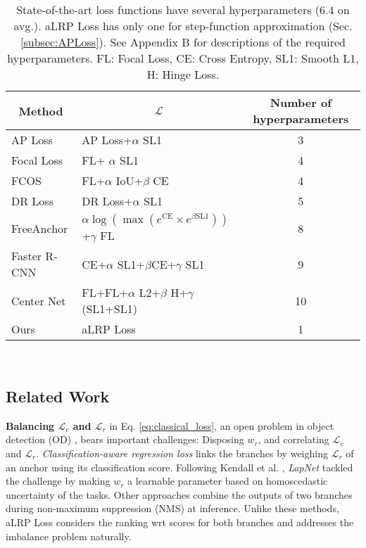 \documentclass{article}
\newcommand{\cellcenter}[1]{\multicolumn{1}{|c|}{#1}}
\begin{document}
\begin{table}[t]
\centering
    \caption{State-of-the-art loss functions have several hyperparameters ($6.4$ on avg.). aLRP Loss has only one for step-function approximation (Sec. \ref{subsec:APLoss}). See Appendix B for descriptions of the required hyperparameters. FL: Focal Loss, CE: Cross Entropy, SL1: Smooth L1, H: Hinge Loss. }
    \label{tab:Hyperparameters}
    \begin{tabular}{|l|l|c|}\hline
         \cellcenter{Method}& \cellcenter{$\mathcal{L}$} & Number of hyperparameters \\ \hline \hline
        AP Loss \cite{APLoss}&AP Loss+$\alpha$ SL1&3 \\ \hline
        Focal Loss \cite{FocalLoss}&FL+ $\alpha$ SL1&4\\ \hline
        FCOS \cite{FCOS}&FL+$\alpha$ IoU+$\beta$ CE&4\\  \hline
        DR Loss \cite{DRLoss}&DR Loss+$\alpha$ SL1&5\\ \hline
        FreeAnchor \cite{FreeAnchor}& $\alpha \log(\max( e^\text{CE} \times e^{\beta \text{SL1}}))$+$\gamma$ FL&8\\\hline
        Faster R-CNN \cite{FasterRCNN}&CE+$\alpha$ SL1+$\beta$CE+$\gamma$ SL1&9\\ \hline
        Center Net \cite{CenterNet}&FL+FL+$\alpha$ L2+$\beta$ H+$\gamma$ (SL1+SL1)&10\\ \hline \hline
        Ours&aLRP Loss&1 \\ \hline
    \end{tabular}\\
\end{table}



%
 \subsection{Related Work}
\label{sec:RelatedWork}
\textbf{Balancing $\mathcal{L}_c$ and $\mathcal{L}_r$} in Eq. \eqref{eq:classical_loss}, an open problem in object detection (OD) \cite{Review}, bears important challenges: Disposing $w_r$, and correlating $\mathcal{L}_c$ and $\mathcal{L}_r$. \textit{Classification-aware regression loss} \cite{PrimeSample} links the branches by weighing $\mathcal{L}_r$ of an anchor using its classification score. Following Kendall et al. \cite{WrLearningviaUncertainty}, \textit{LapNet} \cite{LapNet} tackled the challenge by making $w_r$ a learnable parameter based on homoscedastic uncertainty of the tasks. Other approaches \cite{IoUNet,BoundedIoU} combine the outputs of two branches during non-maximum suppression (NMS) at inference. Unlike these methods, aLRP Loss considers the ranking wrt scores for both branches and  addresses the imbalance problem naturally.
\end{document}
